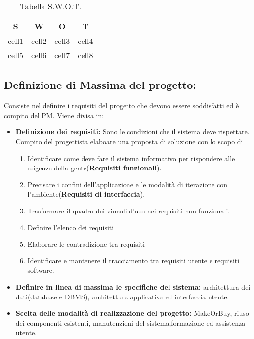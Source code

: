 \documentclass{report}
\begin{document}
\begin{table}[h!]
\begin{center}
\begin{tabular}{ |c|c|c|c| } 
 \hline
 S & W & O & T \\ [0.5ex] 
 \hline\hline
 cell1 & cell2 & cell3 & cell4 \\
 cell5 & cell6 & cell7 & cell8 \\
 \hline
\end{tabular}
\end{center}
\caption{Tabella S.W.O.T.}
\label{swot}
\end{table}




\subsection{Definizione di Massima del progetto:}
Consiste nel definire i requisiti del progetto che devono essere soddisfatti ed è compito del PM.
Viene divisa in:
\begin{itemize}
    \item \textbf{Definizione dei requisiti:} Sono le condizioni che il sistema deve rispettare. 		Compito del progettista elaboare una proposta di soluzione con lo scopo di
    \begin{enumerate}
        \item Identificare come deve fare il sistema informativo per rispondere alle esigenze della gente(\textbf{Requisiti funzionali}).
        \item Precisare i confini dell'applicazione e le modalità di iterazione con l'ambiente(\textbf{Requisiti di interfaccia}).
        \item Trasformare il quadro dei vincoli d’uso nei requisiti non funzionali.
        \item Definire l'elenco dei requisiti
        \item Elaborare le contradizione tra requisiti
        \item Identificare e mantenere il tracciamento tra requisiti utente e requisiti software.
    \end{enumerate}
    
    \item \textbf{Definire in linea di massima le specifiche del sistema:} architettura dei dati(database e DBMS), architettura applicativa ed interfaccia utente. 
    \item \textbf{Scelta delle modalità di realizzazione del progetto:} MakeOrBuy, riuso dei componenti esistenti, manutenzioni del sistema,formazione ed assistenza utente.
\end{itemize}
\end{document}
